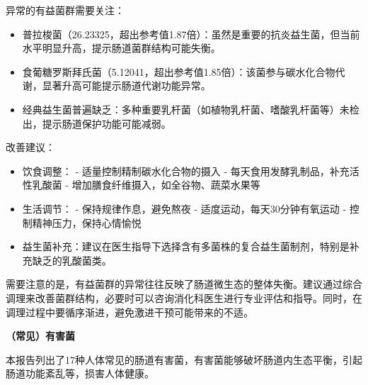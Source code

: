 \documentclass[UTF8]{ctexart}
\begin{document}
\begin{tcolorbox}[
    enhanced,
    colback=gray!3,
    colframe=gray!3,
    arc=3mm,
    boxrule=0pt,
    width=\textwidth,
    top=8pt,
    bottom=8pt
    ]
{\small{\textcolor{yellow!85!orange}{\faLightbulb}}\quad 异常的有益菌群需要关注：
\begin{itemize}
\item 普拉梭菌（26.23325，超出参考值1.87倍）：虽然是重要的抗炎益生菌，但当前水平明显升高，提示肠道菌群结构可能失衡。
\item 食葡糖罗斯拜氏菌（5.12041，超出参考值1.85倍）：该菌参与碳水化合物代谢，显著升高可能提示肠道代谢功能异常。
\item 经典益生菌普遍缺乏：多种重要乳杆菌（如植物乳杆菌、嗜酸乳杆菌等）未检出，提示肠道保护功能可能减弱。
\end{itemize}

{\textcolor{green!85!black}{\faLightbulb}}\quad 改善建议：
\begin{itemize}
\item 饮食调整：
    - 适量控制精制碳水化合物的摄入
    - 每天食用发酵乳制品，补充活性乳酸菌
    - 增加膳食纤维摄入，如全谷物、蔬菜水果等
\item 生活调节：
    - 保持规律作息，避免熬夜
    - 适度运动，每天30分钟有氧运动
    - 控制精神压力，保持心情愉悦
\item 益生菌补充：建议在医生指导下选择含有多菌株的复合益生菌制剂，特别是补充缺乏的乳酸菌类。
\end{itemize}

需要注意的是，有益菌群的异常往往反映了肠道微生态的整体失衡。建议通过综合调理来改善菌群结构，必要时可以咨询消化科医生进行专业评估和指导。同时，在调理过程中要循序渐进，避免激进干预可能带来的不适。
}
\end{tcolorbox}

\newpage

\begin{tcolorbox}[
    enhanced,
    colback=white,
    colframe=white,
    arc=2mm,
    boxrule=0pt,
    width=\textwidth,
    left=15pt,
    right=15pt,
    top=10pt,
    bottom=10pt,
    drop shadow={
        opacity=0.2,
        color=customTeal
    },
    borderline west={5pt}{0pt}{customTeal}
]
\textcolor{customTeal}{\large\textbf{（常见）有害菌}}
\end{tcolorbox}

\begin{tcolorbox}[
    enhanced,
    colback=customTealBg,
    colframe=customTealBg,
    arc=3mm,
    boxrule=0pt,
    width=\textwidth,
    top=8pt,
    bottom=8pt
]
{\small{\color{customTeal}\faInfoCircle} 本报告列出了17种人体常见的肠道有害菌，有害菌能够破坏肠道内生态平衡，引起肠道功能紊乱等，损害人体健康。
}
\end{tcolorbox}
\end{document}
